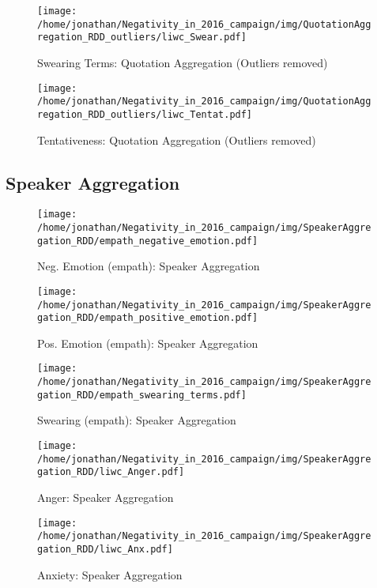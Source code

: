 \begin{figure}[h]\centering
	\texttt{[image: /home/jonathan/Negativity\_in\_2016\_campaign/img/QuotationAggregation\_RDD\_outliers/liwc\_Swear.pdf]}
	\caption{Swearing Terms: Quotation Aggregation (Outliers removed)}
	\label{fig: qa_Swearing Terms}
\end{figure}

\begin{figure}[h]\centering
	\texttt{[image: /home/jonathan/Negativity\_in\_2016\_campaign/img/QuotationAggregation\_RDD\_outliers/liwc\_Tentat.pdf]}
	\caption{Tentativeness: Quotation Aggregation (Outliers removed)}
	\label{fig: qa_Tentativeness}
\end{figure}

\clearpage
\pagebreak

\subsection{Speaker Aggregation}

\begin{figure}[h]\centering
	\texttt{[image: /home/jonathan/Negativity\_in\_2016\_campaign/img/SpeakerAggregation\_RDD/empath\_negative\_emotion.pdf]}
	\caption{Neg. Emotion (empath): Speaker Aggregation}
	\label{fig: sa_Neg. Emotion (empath)}
\end{figure}

\begin{figure}[h]\centering
	\texttt{[image: /home/jonathan/Negativity\_in\_2016\_campaign/img/SpeakerAggregation\_RDD/empath\_positive\_emotion.pdf]}
	\caption{Pos. Emotion (empath): Speaker Aggregation}
	\label{fig: sa_Pos. Emotion (empath)}
\end{figure}

\begin{figure}[h]\centering
	\texttt{[image: /home/jonathan/Negativity\_in\_2016\_campaign/img/SpeakerAggregation\_RDD/empath\_swearing\_terms.pdf]}
	\caption{Swearing (empath): Speaker Aggregation}
	\label{fig: sa_Swearing (empath)}
\end{figure}

\begin{figure}[h]\centering
	\texttt{[image: /home/jonathan/Negativity\_in\_2016\_campaign/img/SpeakerAggregation\_RDD/liwc\_Anger.pdf]}
	\caption{Anger: Speaker Aggregation}
	\label{fig: sa_Anger}
\end{figure}

\begin{figure}[h]\centering
	\texttt{[image: /home/jonathan/Negativity\_in\_2016\_campaign/img/SpeakerAggregation\_RDD/liwc\_Anx.pdf]}
	\caption{Anxiety: Speaker Aggregation}
	\label{fig: sa_Anxiety}
\end{figure}

